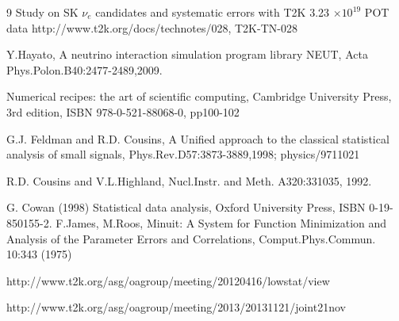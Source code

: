 \begin{thebibliography}{9}
Study on SK $\nu_{e}$ candidates and systematic errors with T2K 3.23 $\times 10^{19}$ POT data
http://www.t2k.org/docs/technotes/028, T2K-TN-028

%
%

  Y.Hayato, A neutrino interaction simulation program library NEUT,
  Acta Phys.Polon.B40:2477-2489,2009.


%
%



%
%

  Numerical recipes: the art of scientific computing, Cambridge University Press, 3rd edition, 
  ISBN 978-0-521-88068-0, pp100-102

  G.J. Feldman and R.D. Cousins,
  A Unified approach to the classical statistical analysis of small signals,
  Phys.Rev.D57:3873-3889,1998; physics/9711021

  R.D. Cousins and V.L.Highland, 
  Nucl.Instr. and Meth. A320:331035, 1992.





  G. Cowan (1998) Statistical data analysis, 
  Oxford University Press, ISBN 0-19-850155-2.
  F.James, M.Roos, Minuit: A System for Function Minimization and Analysis of the 
  Parameter Errors and Correlations, Comput.Phys.Commun. 10:343 (1975)

http://www.t2k.org/asg/oagroup/meeting/20120416/lowstat/view

http://www.t2k.org/asg/oagroup/meeting/2013/20131121/joint21nov

\end{thebibliography}


